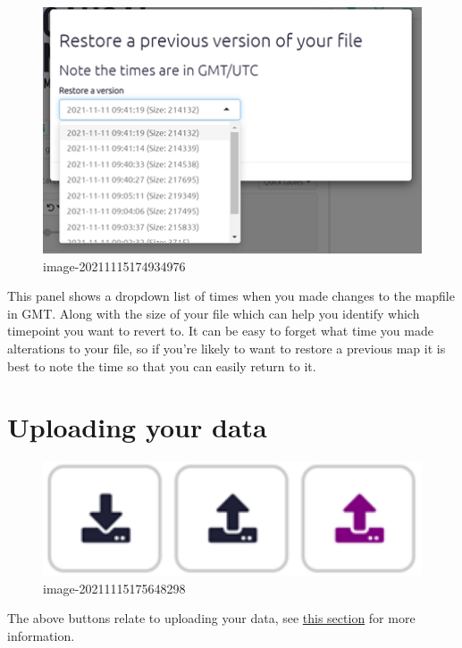 \documentclass[
]{book}
\begin{document}
\begin{figure}
\centering
\includegraphics[width=6.77083in,height=\textheight]{_assets/image-20211115174934976.png}
\caption{image-20211115174934976}
\end{figure}

This panel shows a dropdown list of times when you made changes to the mapfile in GMT. Along with the size of your file which can help you identify which timepoint you want to revert to. It can be easy to forget what time you made alterations to your file, so if you're likely to want to restore a previous map it is best to note the time so that you can easily return to it.

\hypertarget{uploading-your-data}{%
\section{Uploading your data}\label{uploading-your-data}}

\begin{figure}
\centering
\includegraphics[width=6.77083in,height=\textheight]{_assets/image-20211115175648298.png}
\caption{image-20211115175648298}
\end{figure}

The above buttons relate to uploading your data, see \protect\hyperlink{ximport}{this section} for more information.
\end{document}
